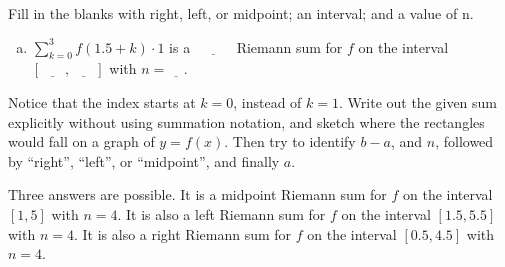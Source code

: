


\begin{Mquestion}[M105 2013A]\label{1.1Riemannb}
Fill in the blanks with right, left, or midpoint;
an interval; and a value of n.

\begin{enumerate}[(a)]
\item[]
$\sum\limits_{k=0}^3 f (1.5 + k) \cdot 1$ is a
$\underline{\ \ \ \ \ \ \ \ \ \ \ \ }$
Riemann sum for $f$ on the interval
$[\,\underline{\ \ \ \ \ \ }\ ,\ \underline{\ \ \ \ \ \ }\,]$ with
$n =\underline{\ \ \ \ \ }$.
\end{enumerate}
\end{Mquestion}

\begin{hint}
Notice that the index starts at $k=0$, instead of $k=1$.
Write out the given sum explicitly without using summation notation, and sketch where the rectangles would fall on a graph of $y=f(x)$.
Then try to identify $b-a$, and $n$,
followed by ``right'', ``left'', or ``midpoint'', and finally $a$.
\end{hint}

\begin{answer}
Three answers are possible.
It is a
midpoint Riemann sum for $f$ on the interval $[1,5]$ with $n =4$.
It is also a left Riemann sum for $f$ on the interval $[1.5,5.5]$ with $n =4$.
It is also a right Riemann sum for $f$ on the interval $[0.5,4.5]$ with $n =4$.
\end{answer}

